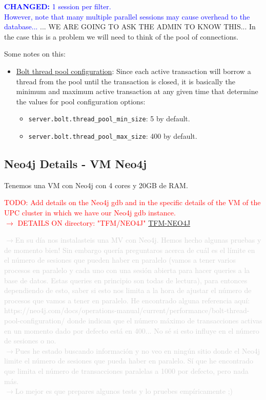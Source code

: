 \textcolor{blue}{\textbf{CHANGED:} 1 session per filter.\\
However, note that many multiple parallel sessions may cause overhead to the database...}
... WE ARE GOING TO ASK THE ADMIN TO KNOW THIS... In the case this is a problem we will need
to think of the pool of connections.


Some notes on this:

\begin{itemize}
  \item \href{https://neo4j.com/docs/operations-manual/current/performance/bolt-thread-pool-configuration/}{Bolt thread pool configuration}: Since each active transaction will borrow a thread from the pool until the transaction is closed, it is basically the minimum and maximum active transaction at any given time that determine the values for pool configuration options: 
  \begin{itemize}
    \item \texttt{server.bolt.thread\_pool\_min\_size}: 5 by default.
    \item \texttt{server.bolt.thread\_pool\_max\_size}: 400 by default.
  \end{itemize}
\end{itemize}

\subsection{Neo4j Details - VM Neo4j}

Tenemos una VM con Neo4j con 4 cores y 20GB de RAM.

\textcolor{red}{TODO: Add details on the Neo4j gdb and in the specific details of the VM of the UPC cluster in which we have our Neo4j gdb instance. \\
$\rightarrow$ DETAILS ON directory: "TFM/NEO4J" \href{https://github.com/FCanfran/TFM-Neo4j}{TFM-NEO4J}}

\textcolor{lightgray}{
$\rightarrow$En su día nos instalasteis una MV con Neo4j. Hemos hecho algunas pruebas y de momento bien!
Sin embargo quería preguntaros acerca de cuál es el límite en el número de sesiones que pueden haber en paralelo  (vamos a tener varios procesos en paralelo y cada uno con una sesión abierta para hacer queries a la base de datos. Estas queries en principio son todas de lectura), para entonces dependiendo de esto, saber si esto nos limita a la hora de ajustar el número de procesos que vamos a tener en paralelo.
He encontrado alguna referencia aquí:
https://neo4j.com/docs/operations-manual/current/performance/bolt-thread-pool-configuration/
donde indican que el número máximo de transacciones activas en un momento dado por defecto está en 400... No sé si esto influye en el número de sesiones o no.\\ $\rightarrow$Pues he estado buscando información y no veo en ningún sitio donde el Neo4j limite el número de sesiones que pueda haber en paralelo. Sí que he encontrado que limita el número de transacciones paralelas a 1000 por defecto, pero nada más.\\ $\rightarrow$Lo mejor es que prepares algunos tests y lo pruebes empíricamente ;)
}

\newpage

